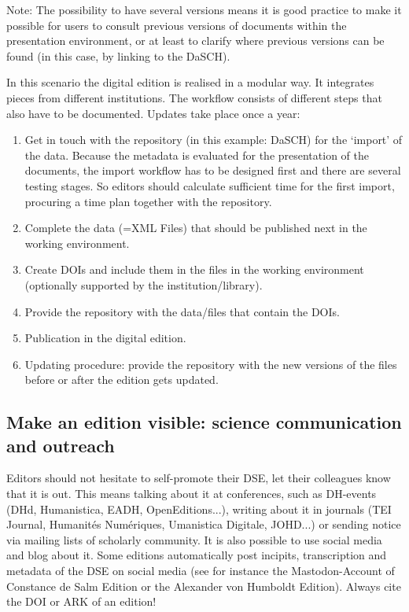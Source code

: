 \documentclass[
  letterpaper,
  DIV=11,
  numbers=noendperiod]{scrreprt}
\begin{document}
Note: The possibility to have several versions means it is good practice
to make it possible for users to consult previous versions of documents
within the presentation environment, or at least to clarify where
previous versions can be found (in this case, by linking to the DaSCH).

In this scenario the digital edition is realised in a modular way. It
integrates pieces from different institutions. The workflow consists of
different steps that also have to be documented. Updates take place once
a year:

\begin{enumerate}
\def\labelenumi{\arabic{enumi}.}
\item
  Get in touch with the repository (in this example: DaSCH) for the
  `import' of the data. Because the metadata is evaluated for the
  presentation of the documents, the import workflow has to be designed
  first and there are several testing stages. So editors should
  calculate sufficient time for the first import, procuring a time plan
  together with the repository.
\item
  Complete the data (=XML Files) that should be published next in the
  working environment.
\item
  Create DOIs and include them in the files in the working environment
  (optionally supported by the institution/library).
\item
  Provide the repository with the data/files that contain the DOIs.
\item
  Publication in the digital edition.
\item
  Updating procedure: provide the repository with the new versions of
  the files before or after the edition gets updated.
\end{enumerate}

\subsection{Make an edition visible: science communication and
outreach}\label{make-an-edition-visible-science-communication-and-outreach}

Editors should not hesitate to self-promote their DSE, let their
colleagues know that it is out. This means talking about it at
conferences, such as DH-events (DHd, Humanistica, EADH,
OpenEditions...), writing about it in journals (TEI Journal, Humanités
Numériques, Umanistica Digitale, JOHD...) or sending notice via mailing
lists of scholarly community. It is also possible to use social media
and blog about it. Some editions automatically post incipits,
transcription and metadata of the DSE on social media (see for instance
the Mastodon-Account of Constance de Salm Edition or the Alexander von
Humboldt Edition). Always cite the DOI or ARK of an edition!
\end{document}

